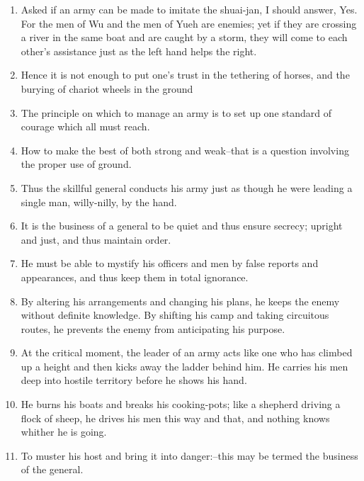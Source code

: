 \begin{enumerate}
  \item Asked if an army can be made to imitate the shuai-jan, I
    should answer, Yes. For the men of Wu and the men of Yueh are
    enemies; yet if they are crossing a river in the same boat and are
    caught by a storm, they will come to each other's assistance just
    as the left hand helps the right.

  \item Hence it is not enough to put one's trust in the tethering of
    horses, and the burying of chariot wheels in the ground

  \item The principle on which to manage an army is to set up one
    standard of courage which all must reach.

  \item How to make the best of both strong and weak--that is a
    question involving the proper use of ground.

  \item Thus the skillful general conducts his army just as though he
    were leading a single man, willy-nilly, by the hand.

  \item It is the business of a general to be quiet and thus ensure
    secrecy; upright and just, and thus maintain order.

  \item He must be able to mystify his officers and men by false
    reports and appearances, and thus keep them in total ignorance.

  \item By altering his arrangements and changing his plans, he keeps
    the enemy without definite knowledge. By shifting his camp and
    taking circuitous routes, he prevents the enemy from anticipating
    his purpose.

  \item At the critical moment, the leader of an army acts like one
    who has climbed up a height and then kicks away the ladder behind
    him. He carries his men deep into hostile territory before he
    shows his hand.

  \item He burns his boats and breaks his cooking-pots; like a
    shepherd driving a flock of sheep, he drives his men this way and
    that, and nothing knows whither he is going.

  \item To muster his host and bring it into danger:--this may be
    termed the business of the general.


\end{enumerate}
